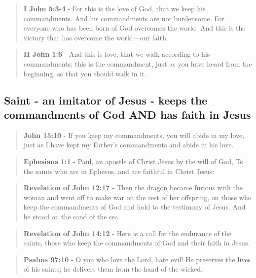 \documentclass[11pt]{article}
\begin{document}
\begin{quote}
\textbf{I John 5:3-4} - For this is the love of God, that we keep his commandments. And his commandments are not burdensome. For everyone who has been born of God overcomes the world. And this is the victory that has overcome the world—our faith.
\end{quote}

\begin{quote}
\textbf{II John 1:6} - And this is love, that we walk according to his commandments; this is the commandment, just as you have heard from the beginning, so that you should walk in it.
\end{quote}

\subsection{Saint - an imitator of Jesus - keeps the commandments of God AND has faith in Jesus}
\label{sec:org3946b5c}
\begin{quote}
\textbf{John 15:10} - If you keep my commandments, you will abide in my love, just as I have kept my Father's commandments and abide in his love.
\end{quote}

\begin{quote}
\textbf{Ephesians 1:1} - Paul, an apostle of Christ Jesus by the will of God, To the saints who are in Ephesus, and are faithful in Christ Jesus:
\end{quote}

\begin{quote}
\textbf{Revelation of John 12:17} - Then the dragon became furious with the woman and went off to make war on the rest of her offspring, on those who keep the commandments of God and hold to the testimony of Jesus. And he stood on the sand of the sea.
\end{quote}

\begin{quote}
\textbf{Revelation of John 14:12} - Here is a call for the endurance of the saints, those who keep the commandments of God and their faith in Jesus.
\end{quote}

\begin{quote}
\textbf{Psalms 97:10} - O you who love the Lord, hate evil! He preserves the lives of his saints; he delivers them from the hand of the wicked.
\end{quote}
\end{document}
